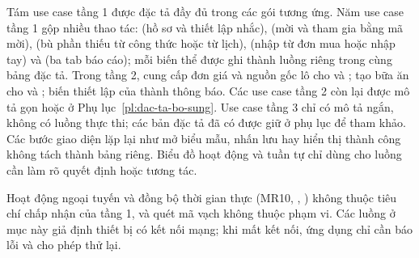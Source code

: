 Tám use case tầng 1 được đặc tả đầy đủ trong các gói tương ứng. Năm use case tầng 1 gộp nhiều thao tác:  (hồ sơ và thiết lập nhắc),  (mời và tham gia bằng mã mời),  (bù phần thiếu từ công thức hoặc từ lịch),  (nhập từ đơn mua hoặc nhập tay) và  (ba tab báo cáo); mỗi biến thể được ghi thành luồng riêng trong cùng bảng đặc tả. Trong tầng 2,  cung cấp đơn giá và nguồn gốc lô cho  và ;  tạo bữa ăn cho  và ;  biến thiết lập của  thành thông báo. Các use case tầng 2 còn lại được mô tả gọn hoặc ở Phụ lục~\ref{pl:dac-ta-bo-sung}. Use case tầng 3 chỉ có mô tả ngắn, không có luồng thực thi; các bản đặc tả đã có được giữ ở phụ lục để tham khảo. Các bước giao diện lặp lại như mở biểu mẫu, nhấn lưu hay hiển thị thành công không tách thành bảng riêng. Biểu đồ hoạt động và tuần tự chỉ dùng cho luồng cần làm rõ quyết định hoặc tương tác.

Hoạt động ngoại tuyến và đồng bộ thời gian thực (MR10, , ) không thuộc tiêu chí chấp nhận của tầng 1, và quét mã vạch không thuộc phạm vi. Các luồng ở mục này giả định thiết bị có kết nối mạng; khi mất kết nối, ứng dụng chỉ cần báo lỗi và cho phép thử lại.
